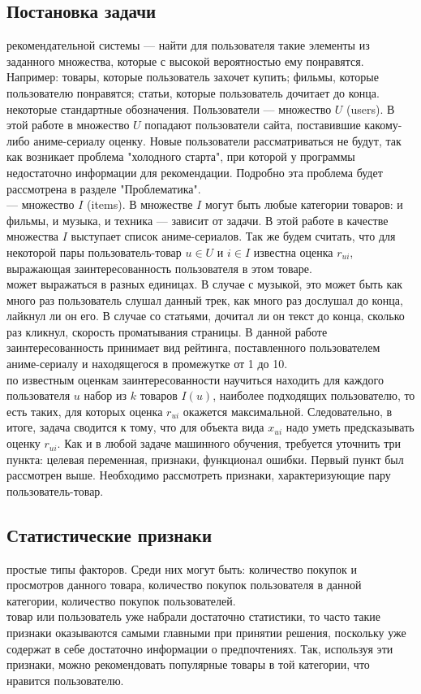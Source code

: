 \documentclass{article}
\newcommand\tab[1][1cm]{\hspace*{#1}}
\begin{document}
\subsection{Постановка задачи}
 рекомендательной системы — найти для пользователя такие элементы из заданного множества, которые с высокой вероятностью ему понравятся. Например: товары, которые пользователь захочет купить; фильмы, которые пользователю понравятся; статьи, которые пользователь дочитает до конца.\\
 некоторые стандартные обозначения. Пользователи — множество $﻿U$ (users). В этой работе в множество ﻿$U$ попадают пользователи сайта, поставившие какому-либо аниме-сериалу оценку. Новые пользователи рассматриваться не будут, так как возникает проблема "холодного старта", при которой у программы недостаточно информации для рекомендации. Подробно эта проблема будет рассмотрена в разделе "Проблематика".\\
 — множество ﻿$I$﻿ (items). В множестве $I$ могут быть любые категории товаров: и фильмы, и музыка, и техника — зависит от задачи. В этой работе в качестве множества $I$ выступает список аниме-сериалов. Так же будем считать, что для некоторой пары пользователь-товар ﻿$u\in U$ и $i\in I$﻿﻿ известна оценка $r_{ui}$, выражающая заинтересованность пользователя в этом товаре.\\
 может выражаться в разных единицах. В случае с музыкой, это может быть как много раз пользователь слушал данный трек, как много раз дослушал до конца, лайкнул ли он его. В случае со статьями, дочитал ли он текст до конца, сколько раз кликнул, скорость проматывания страницы. В данной работе заинтересованность принимает вид рейтинга, поставленного пользователем аниме-сериалу и находящегося в промежутке от 1 до 10.\\
 по известным оценкам заинтересованности научиться находить для каждого пользователя $u$ набор из ﻿$k$ товаров ﻿$I(u)$, наиболее подходящих пользователю, то есть таких, для которых оценка ﻿$r_{ui}$ окажется максимальной. Следовательно, в итоге, задача сводится к тому, что для объекта вида ﻿$x_{ui}$ надо уметь предсказывать оценку $r_{ui}$. Как и в любой задаче машинного обучения, требуется уточнить три пункта: целевая переменная, признаки, функционал ошибки. Первый пункт был рассмотрен выше. Необходимо рассмотреть признаки, характеризующие пару пользователь-товар.
\newpage
\subsection{Статистические признаки}
 простые типы факторов. Среди них могут быть: количество покупок и просмотров данного товара, количество покупок пользователя в данной категории, количество покупок пользователей.\\
 товар или пользователь уже набрали достаточно статистики, то часто такие признаки оказываются самыми главными при принятии решения, поскольку уже содержат в себе достаточно информации о предпочтениях. Так, используя эти признаки, можно рекомендовать популярные товары в той категории, что нравится пользователю.
\end{document}
